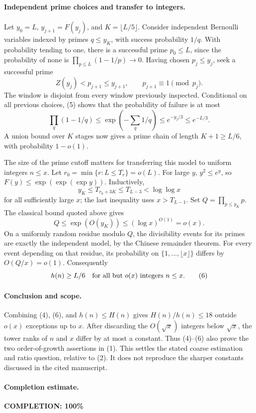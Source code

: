 \paragraph{Independent prime choices and transfer to integers.}
Let \(y_0=L\), \(y_{j+1}=F(y_j)\), and
\(K=\lfloor L/5\rfloor\). Consider independent Bernoulli
variables indexed by primes \(q\leq y_K\), with success
probability \(1/q\).
With probability tending to one, there is a successful
prime \(p_0\leq L\), since the probability of none is
\(\prod_{p\leq L}(1-1/p)\longrightarrow0\).
Having chosen \(p_j\leq y_j\), seek a successful prime
\[
 Z(y_j)<p_{j+1}\leq y_{j+1},\qquad p_{j+1}\equiv1\pmod{p_j}.
\]
The window is disjoint from every window previously inspected.
Conditional on all previous choices, (5) shows that the
probability of failure is at most
\[
 \prod_q(1-1/q)\leq\exp\left(-\sum_q1/q\right)
 \leq e^{-y_j/3}\leq e^{-L/3}.
\]
A union bound over \(K\) stages now gives a prime chain of
length \(K+1\geq L/6\), with probability \(1-o(1)\).

The size of the prime cutoff matters for transferring this
model to uniform integers \(n\leq x\).
Let \(r_0=\min\{r:L\leq T_r\}=o(L)\).
For large \(y\), \(y^2\leq e^y\), so \(F(y)\leq\exp(\exp(\exp y))\).
Inductively,
\[
 y_K\leq T_{r_0+3K}\leq T_{L-3}<\log\log x
\]
for all sufficiently large \(x\); the last inequality uses
\(x>T_{L-1}\).
Set \(Q=\prod_{p\leq y_K}p\). The classical bound quoted above
gives
\[
 Q\leq\exp(O(y_K))\leq(\log x)^{O(1)}=o(x).
\]
On a uniformly random residue modulo \(Q\), the divisibility
events for its primes are exactly the independent model,
by the Chinese remainder theorem.
For every event depending on that residue, its probability
on \(\{1,\ldots,\lfloor x\rfloor\}\) differs by \(O(Q/x)=o(1)\).
Consequently
\[
 h(n)\geq L/6
 \quad\hbox{for all but }o(x)\hbox{ integers }n\leq x.            \tag{6}
\]

\paragraph{Conclusion and scope.}
Combining (4), (6), and \(h(n)\leq H(n)\) gives
\(H(n)/h(n)\leq18\) outside \(o(x)\) exceptions up to \(x\).
After discarding the \(O(\sqrt x)\) integers below \(\sqrt x\),
the tower ranks of \(n\) and \(x\) differ by at most a constant.
Thus (4)--(6) also prove the two order-of-growth assertions in (1).
This settles the stated coarse estimation and ratio question,
relative to (2). It does not reproduce the sharper constants
discussed in the cited manuscript.

\paragraph{Completion estimate.}
\textbf{COMPLETION: 100\%}
